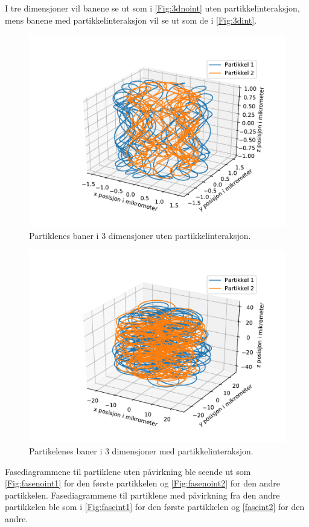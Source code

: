 \documentclass[reprint,english,notitlepage, nofootinbib]{revtex4-1}  %
\begin{document}
I tre dimensjoner vil banene se ut som i \autoref{Fig:3dnoint} uten partikkelinteraksjon, mens banene med partikkelinteraksjon vil se ut som de i \autoref{Fig:3dint}.
\begin{figure}[H]
	\centering
	\includegraphics[scale=0.4]{../pythonplots/3dr2noint.pdf}
	\caption{Partiklenes baner i 3 dimensjoner uten partikkelinteraksjon.}
	\label{Fig:3dnoint}
\end{figure}
\begin{figure}[H]
	\centering
	\includegraphics[scale=0.4]{../pythonplots/3dr2int.pdf}
	\caption{Partikelenes baner i 3 dimensjoner med partikkelinteraksjon.}
	\label{Fig:3dint}
\end{figure}
Fasediagrammene til partiklene uten påvirkning ble seende ut som \autoref{Fig:fasenoint1} for den første partikkelen og \autoref{Fig:fasenoint2} for den andre partikkelen. Fasediagrammene til partiklene med påvirkning fra den andre partikkelen ble som i \autoref{Fig:faseint1} for den første partikkelen og \autoref{faseint2} for den andre.
\end{document}
